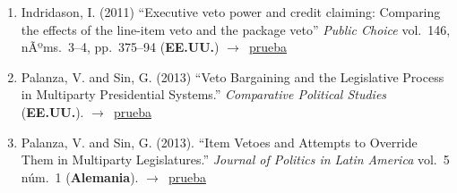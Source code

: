 \documentclass[12 pt, letter]{article}
\newenvironment{CitasMiTrabajo}{
    \begin{footnotesize}
    \begin{enumerate}[label={\footnotesize\emph{cita~\arabic*}},ref=\arabic*] %
        \setlength{\itemsep}{.1\itemsep}
        \setlength{\parskip}{.1\parskip}
    }{\end{enumerate}\end{footnotesize}}
\begin{document}
\begin{CitasMiTrabajo}
        \item Indridason, I. (2011) ``Executive veto power and credit claiming: Comparing the effects of the line-item veto and the package veto''
            \emph{Public Choice} vol.\ 146, nÃºms.\ 3--4, pp.~375--94 (\textbf{EE.UU.}) $\rightarrow$~\href{http://ericmagar.com/cv/cites/BullyPulpits/indridasson2011pubcho.pdf}{prueba}

        \item Palanza, V. and Sin, G. (2013) ``Veto Bargaining and the Legislative Process in Multiparty Presidential Systems.'' \emph{Comparative Political Studies} (\textbf{EE.UU.}). $\rightarrow$~\href{http://ericmagar.com/cv/cites/BullyPulpits/palanza.sin2013jpla.excerpts.pdf}{prueba}

        \item Palanza, V. and Sin, G. (2013). ``Item Vetoes and Attempts to Override Them in Multiparty Legislatures.'' \emph{Journal of Politics in Latin America} vol.~5 n\'um.~1 (\textbf{Alemania}). $\rightarrow$~\href{http://ericmagar.com/cv/cites/BullyPulpits/sin.palanza2014cps.excerpts.pdf}{prueba}


        \label{ncites:magar.2001} %





        \end{CitasMiTrabajo}
\end{document}
